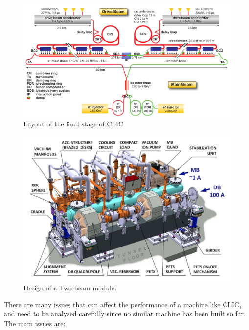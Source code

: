 \begin{figure}[h]
\centering

\includegraphics[scale=0.39]{pictures/CLIC_layout_3Tev}
\caption{Layout of the final stage of CLIC}
\label{CLIC_layout}

\end{figure}

\begin{figure}

\includegraphics[scale=0.39]{pictures/TBM}
\caption{Design of a Two-beam module. }
\label{TBM}

\end{figure}







There are many issues that can affect the performance of a machine like CLIC, and need to be analysed carefully since no similar machine has been built so far. The main issues are:

